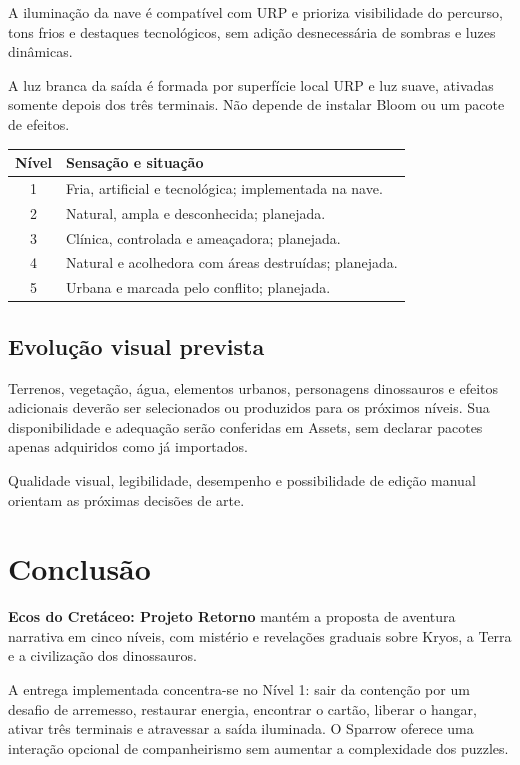 \documentclass[12pt,a4paper]{article}
\newcommand{\jogo}{\textbf{Ecos do Cretáceo: Projeto Retorno}}
\begin{document}
A iluminação da nave é compatível com URP e prioriza visibilidade
do percurso, tons frios e destaques tecnológicos, sem adição
desnecessária de sombras e luzes dinâmicas.

A luz branca da saída é formada por superfície local URP e luz
suave, ativadas somente depois dos três terminais. Não depende
de instalar Bloom ou um pacote de efeitos.

\begin{center}
\begin{tabularx}{\textwidth}{|c|X|}
\hline
\textbf{Nível} & \textbf{Sensação e situação}\\
\hline
1 & Fria, artificial e tecnológica; implementada na nave.\\
\hline
2 & Natural, ampla e desconhecida; planejada.\\
\hline
3 & Clínica, controlada e ameaçadora; planejada.\\
\hline
4 & Natural e acolhedora com áreas destruídas; planejada.\\
\hline
5 & Urbana e marcada pelo conflito; planejada.\\
\hline
\end{tabularx}
\end{center}

\subsection*{Evolução visual prevista}

Terrenos, vegetação, água, elementos urbanos, personagens
dinossauros e efeitos adicionais deverão ser selecionados ou
produzidos para os próximos níveis. Sua disponibilidade e adequação
serão conferidas em Assets, sem declarar pacotes apenas adquiridos
como já importados.

Qualidade visual, legibilidade, desempenho e possibilidade de
edição manual orientam as próximas decisões de arte.



\section*{Conclusão}


\jogo{} mantém a proposta de aventura narrativa em cinco níveis,
com mistério e revelações graduais sobre Kryos, a Terra e a
civilização dos dinossauros.

A entrega implementada concentra-se no Nível 1: sair da contenção
por um desafio de arremesso, restaurar energia, encontrar o cartão,
liberar o hangar, ativar três terminais e atravessar a saída iluminada.
O Sparrow oferece uma interação opcional de companheirismo sem
aumentar a complexidade dos puzzles.
\end{document}
